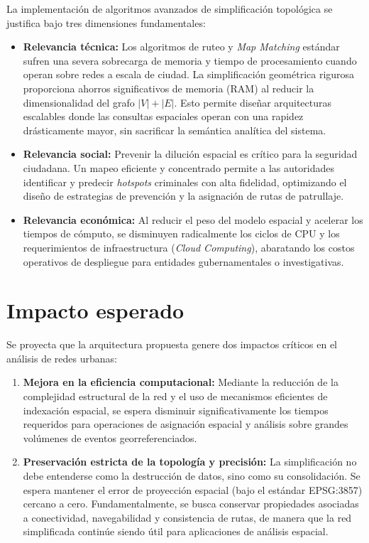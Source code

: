 La implementación de algoritmos avanzados de simplificación topológica se justifica bajo tres dimensiones fundamentales:

\begin{itemize}
    \item \textbf{Relevancia técnica:} Los algoritmos de ruteo y \textit{Map Matching} estándar sufren una severa sobrecarga de memoria y tiempo de procesamiento cuando operan sobre redes a escala de ciudad. La simplificación geométrica rigurosa proporciona ahorros significativos de memoria (RAM) al reducir la dimensionalidad del grafo $|V| + |E|$. Esto permite diseñar arquitecturas escalables donde las consultas espaciales operan con una rapidez drásticamente mayor, sin sacrificar la semántica analítica del sistema.
    
    \item \textbf{Relevancia social:} Prevenir la dilución espacial es crítico para la seguridad ciudadana. Un mapeo eficiente y concentrado permite a las autoridades identificar y predecir \textit{hotspots} criminales con alta fidelidad, optimizando el diseño de estrategias de prevención y la asignación de rutas de patrullaje.
    
    \item \textbf{Relevancia económica:} Al reducir el peso del modelo espacial y acelerar los tiempos de cómputo, se disminuyen radicalmente los ciclos de CPU y los requerimientos de infraestructura (\textit{Cloud Computing}), abaratando los costos operativos de despliegue para entidades gubernamentales o investigativas.
\end{itemize}

\section{Impacto esperado}

Se proyecta que la arquitectura propuesta genere dos impactos críticos en el análisis de redes urbanas:

\begin{enumerate}
    \item \textbf{Mejora en la eficiencia computacional:} Mediante la reducción de la complejidad estructural de la red y el uso de mecanismos eficientes de indexación espacial, se espera disminuir significativamente los tiempos requeridos para operaciones de asignación espacial y análisis sobre grandes volúmenes de eventos georreferenciados.
    
    \item \textbf{Preservación estricta de la topología y precisión:} La simplificación no debe entenderse como la destrucción de datos, sino como su consolidación. Se espera mantener el error de proyección espacial (bajo el estándar EPSG:3857) cercano a cero. Fundamentalmente, se busca conservar propiedades asociadas a conectividad, navegabilidad y consistencia de rutas, de manera que la red simplificada continúe siendo útil para aplicaciones de análisis espacial.
\end{enumerate}

